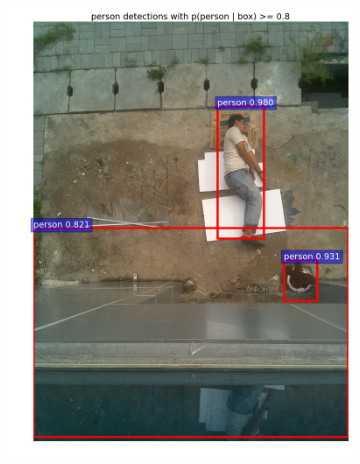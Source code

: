 \begin{figure}[ht]
\begin{subfigure}[b]{0.27\textwidth}
    \includegraphics[width=\textwidth]{2}
    \caption{}
  \end{subfigure}
  \begin{subfigure}[b]{0.27\textwidth}

\end{subfigure}
\end{figure}
